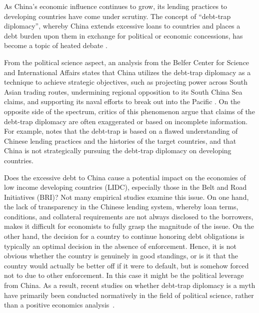 As China's economic influence continues to grow, its lending practices to developing countries have come under scrutiny.
The concept of ``debt-trap diplomacy'', whereby China extends excessive loans to countries and places a debt burden upon them in exchange for political or economic concessions, has become a topic of heated debate \citep{Chellaney_2017}.

From the political science aspect, an analysis from the Belfer Center for Science and International Affairs states that China utilizes the debt-trap diplomacy as a technique to achieve strategic objectives, such as projecting power across South Asian trading routes, undermining regional opposition to its South China Sea claims, and supporting its naval efforts to break out into the Pacific \citep*{Parker2018}.
On the opposite side of the spectrum, critics of this phenomenon argue that claims of the debt-trap diplomacy are often exaggerated or based on incomplete information. For example, \citet*{Brautigam-meme-2020} notes that the debt-trap is based on a flawed understanding of Chinese lending practices and the histories of the target countries, and that China is not strategically pursuing the debt-trap diplomacy on developing countries.

Does the excessive debt to China cause a potential impact on the economies of low income developing countries (LIDC), especially those in the Belt and Road Initiatives (BRI)? Not many empirical studies examine this issue.
On one hand, the lack of transparency in the Chinese lending system, whereby loan terms, conditions, and collateral requirements are not always disclosed to the borrowers, makes it difficult for economists to fully grasp the magnitude of the issue.
On the other hand, the decision for a country to continue honoring debt obligations is typically an optimal decision in the absence of enforcement. Hence, it is not obvious whether the country is genuinely in good standings, or is it that the country would actually be better off if it were to default, but is somehow forced not to due to other enforcement. In this case it might be the political leverage from China.
As a result, recent studies on whether debt-trap diplomacy is a myth have primarily been conducted normatively in the field of political science, rather than a positive economics analysis~\citep[see, e.g.,][]{Himmer2023-vn,Chen2020-eo}.

